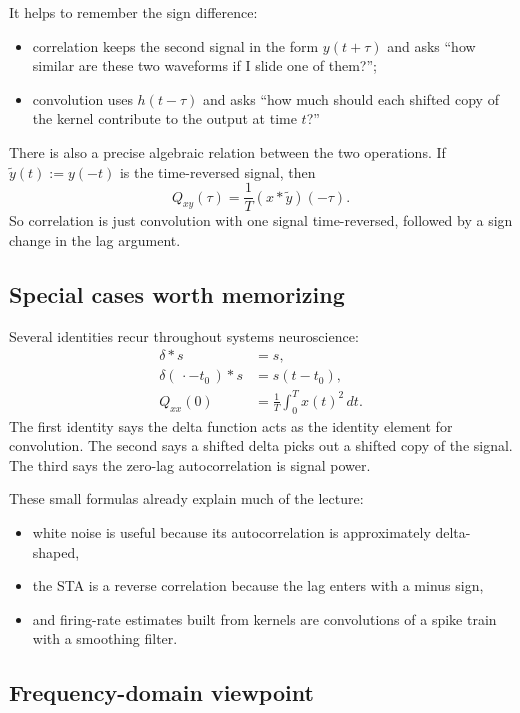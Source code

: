 \documentclass[11pt]{article}
\begin{document}
It helps to remember the sign difference:
\begin{itemize}
    \item correlation keeps the second signal in the form $y(t+\tau)$ and asks ``how similar are these two waveforms if I slide one of them?'';
    \item convolution uses $h(t-\tau)$ and asks ``how much should each shifted copy of the kernel contribute to the output at time $t$?''
\end{itemize}

There is also a precise algebraic relation between the two operations. If $\tilde{y}(t):=y(-t)$ is the time-reversed signal, then
\[
Q_{xy}(\tau)=\frac{1}{T}(x * \tilde{y})(-\tau).
\]
So correlation is just convolution with one signal time-reversed, followed by a sign change in the lag argument.

\subsection{Special cases worth memorizing}

Several identities recur throughout systems neuroscience:
\begin{align*}
\delta * s &= s,\\
\delta(\,\cdot - t_0\,) * s &= s(t-t_0),\\
Q_{xx}(0) &= \frac{1}{T}\int_0^T x(t)^2\,dt.
\end{align*}
The first identity says the delta function acts as the identity element for convolution. The second says a shifted delta picks out a shifted copy of the signal. The third says the zero-lag autocorrelation is signal power.

These small formulas already explain much of the lecture:
\begin{itemize}
    \item white noise is useful because its autocorrelation is approximately delta-shaped,
    \item the STA is a reverse correlation because the lag enters with a minus sign,
    \item and firing-rate estimates built from kernels are convolutions of a spike train with a smoothing filter.
\end{itemize}

\subsection{Frequency-domain viewpoint}
\end{document}
